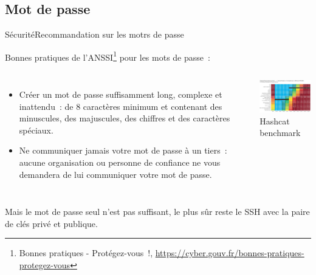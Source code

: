 \documentclass{beamer}
\begin{document}
    \subsection{Mot de passe}\label{subsec:password}
    \begin{frame}{Sécurité}{Recommandation sur les motrs de passe}
        \begin{footnotesize}
            Bonnes pratiques de l'ANSSI\footnote{Bonnes pratiques - Protégez-vous~!, \url{https://cyber.gouv.fr/bonnes-pratiques-protegez-vous}} pour les mots de passe~:
            \begin{columns}
                \begin{itemize}
                    \item Créer un mot de passe suffisamment long, complexe et inattendu~:
                    de 8 caractères minimum et contenant des minuscules, des majuscules,
                    des chiffres et des caractères spéciaux.

                    \item Ne communiquer jamais votre mot de passe à un tiers~: aucune
                    organisation ou personne de confiance ne vous demandera de lui
                    communiquer votre mot de passe.

                \end{itemize}
                \centering
                \includegraphics[width=6.5cm]{image/real-password-cracking} \\ Hashcat benchmark\footnotemark \\
            \end{columns}
            Mais le mot de passe seul n'est pas suffisant, le plus sûr reste le SSH avec la paire de clés privé et publique.
        \end{footnotesize}
    \end{frame}
\end{document}
